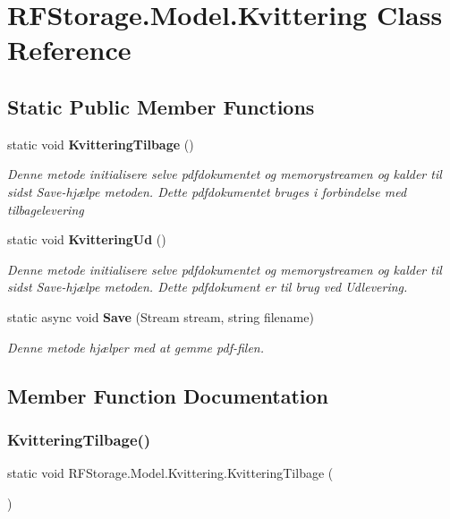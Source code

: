 \section{R\+F\+Storage.\+Model.\+Kvittering Class Reference}
\label{class_r_f_storage_1_1_model_1_1_kvittering}
\subsection*{Static Public Member Functions}
\begin{DoxyCompactItemize}
\item 
static void \textbf{ Kvittering\+Tilbage} ()
\begin{DoxyCompactList}\small\item\em Denne metode initialisere selve pdfdokumentet og memorystreamen og kalder til sidst Save-\/hjælpe metoden. Dette pdfdokumentet bruges i forbindelse med tilbagelevering \end{DoxyCompactList}\item 
static void \textbf{ Kvittering\+Ud} ()
\begin{DoxyCompactList}\small\item\em Denne metode initialisere selve pdfdokumentet og memorystreamen og kalder til sidst Save-\/hjælpe metoden. Dette pdfdokument er til brug ved Udlevering. \end{DoxyCompactList}\item 
static async void \textbf{ Save} (Stream stream, string filename)
\begin{DoxyCompactList}\small\item\em Denne metode hjælper med at gemme pdf-\/filen. \end{DoxyCompactList}\end{DoxyCompactItemize}


\subsection{Member Function Documentation}
\mbox{\label{class_r_f_storage_1_1_model_1_1_kvittering_a6a7506b6a7e016913e26e7e23e9cd381}} 
\subsubsection{KvitteringTilbage()}
{\footnotesize\ttfamily static void R\+F\+Storage.\+Model.\+Kvittering.\+Kvittering\+Tilbage (\begin{DoxyParamCaption}{ }\end{DoxyParamCaption})\hspace{0.3cm}{\ttfamily [static]}}



